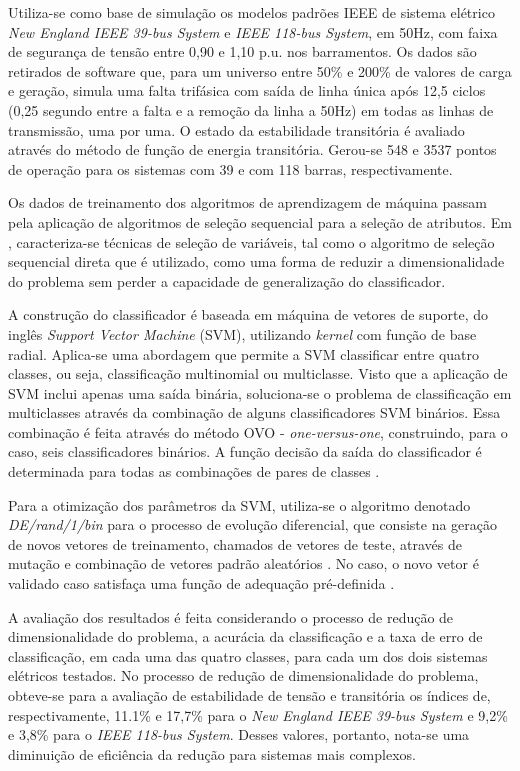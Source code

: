 \documentclass[12pt,oneside,a4paper,chapter=TITLE,section=TITLE,sumario=tradicional,english,brazil]{abntex2}
\begin{document}
	\par 
	Utiliza-se como base de simulação os modelos padrões IEEE de sistema elétrico \textit{New England IEEE 39-bus System} e \textit{IEEE 118-bus System}, em 50Hz, com faixa de segurança de tensão entre 0,90 e 1,10 p.u. nos barramentos. Os dados são retirados de software que, para um universo entre 50\% e 200\% de valores de carga e geração, simula uma falta trifásica com saída de linha única após 12,5 ciclos (0,25 segundo entre a falta e a remoção da linha a 50Hz) em todas as linhas de transmissão, uma por uma. O estado da estabilidade transitória é avaliado através do método de função de energia transitória. Gerou-se 548 e 3537 pontos de operação para os sistemas com 39 e com 118 barras, respectivamente.\par
	Os dados de treinamento dos algoritmos de aprendizagem de máquina passam pela aplicação de algoritmos de seleção sequencial para a seleção de atributos. Em \textcite{theodoridis2003}, caracteriza-se técnicas de seleção de variáveis, tal como o algoritmo de seleção sequencial direta que é utilizado, como uma forma de reduzir a dimensionalidade do problema sem perder a capacidade de generalização do classificador.  \par
	A construção do classificador é baseada em máquina de vetores de suporte, do inglês \textit{Support Vector Machine} (SVM), utilizando \textit{kernel} com função de base radial. Aplica-se uma abordagem que permite a SVM classificar entre quatro classes, ou seja, classificação multinomial ou multiclasse. Visto que a aplicação de SVM inclui apenas uma saída binária, soluciona-se o problema de classificação em multiclasses através da combinação de alguns classificadores SVM binários. Essa combinação é feita através do método OVO - \textit{one-versus-one}, construindo, para o caso, seis classificadores binários. A função decisão da saída do classificador é determinada para todas as combinações de pares de classes \cite{platt2000}\cite{hsu2002}.\par
	 Para a otimização dos parâmetros da SVM, utiliza-se o algoritmo denotado \textit{DE/rand/1/bin} para o processo de evolução diferencial, que consiste na geração de novos vetores de treinamento, chamados de vetores de teste, através de mutação e combinação de vetores padrão aleatórios \cite{storn2005}. No caso, o novo vetor é validado caso satisfaça uma função de adequação pré-definida \cite{storn1997}.\par
	A avaliação dos resultados é feita considerando o processo de redução de dimensionalidade do problema, a acurácia da classificação e a taxa de erro de classificação, em cada uma das quatro classes, para cada um dos dois sistemas elétricos testados. No processo de redução de dimensionalidade do problema, obteve-se  para a avaliação de estabilidade de tensão e transitória os índices de, respectivamente, 11.1\% e 17,7\% para o \textit{New England IEEE 39-bus System} e 9,2\% e 3,8\% para o \textit{IEEE 118-bus System}. Desses valores, portanto, nota-se uma diminuição de eficiência da redução para sistemas mais complexos.\par
\end{document}
